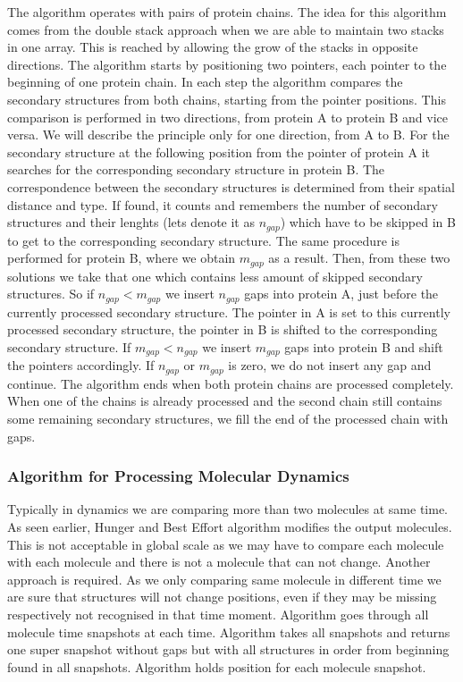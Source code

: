 \documentclass[twocolumn]{bmcart}%
\begin{document}
The algorithm operates with pairs of protein chains.
The idea for this algorithm comes from the double stack approach when we are able to maintain two stacks in one array.
This is reached by allowing the grow of the stacks in opposite directions.
The algorithm starts by positioning two pointers, each pointer to the beginning of one protein chain.
In each step the algorithm compares the secondary structures from both chains, starting from the pointer positions.
This comparison is performed in two directions, from protein A to protein B and vice versa.
We will describe the principle only for one direction, from A to B.
For the secondary structure at the following position from the pointer of protein A it searches for the corresponding secondary structure in protein B.
The correspondence between the secondary structures is determined from their spatial distance and type.
If found, it counts and remembers the number of secondary structures and their lenghts (lets denote it as $n_{gap}$) which have to be skipped in B to get to the corresponding secondary structure.
The same procedure is performed for protein B, where we obtain $m_{gap}$ as a result.
Then, from these two solutions we take that one which contains less amount of skipped secondary structures.
So if $n_{gap} < m_{gap}$ we insert $n_{gap}$ gaps into protein A, just before the currently processed secondary structure.
The pointer in A is set to this currently processed secondary structure, the pointer in B is shifted to the corresponding secondary structure.
If $m_{gap} < n_{gap}$ we insert $m_{gap}$ gaps into protein B and shift the pointers accordingly.
If $n_{gap}$ or $m_{gap}$ is zero, we do not insert any gap and continue.
The algorithm ends when both protein chains are processed completely.
When one of the chains is already processed and the second chain still contains some remaining secondary structures, we fill the end of the processed chain with gaps.

\subsubsection*{Algorithm for Processing Molecular Dynamics}



Typically in dynamics we are comparing more than two molecules at same time. 
As seen earlier, Hunger and Best Effort algorithm modifies the output molecules. 
This is not acceptable in global scale as we may have to compare each molecule with each molecule and there is not a molecule that can not change. 
Another approach is required. 
As we only comparing same molecule in different time we are sure that structures will not change positions, even if they may be missing respectively not recognised in that time moment. Algorithm goes through all molecule time snapshots at each time. Algorithm takes all snapshots and returns one super snapshot without gaps but with all structures in order from beginning found in all snapshots. Algorithm holds position for each molecule snapshot.
\end{document}
